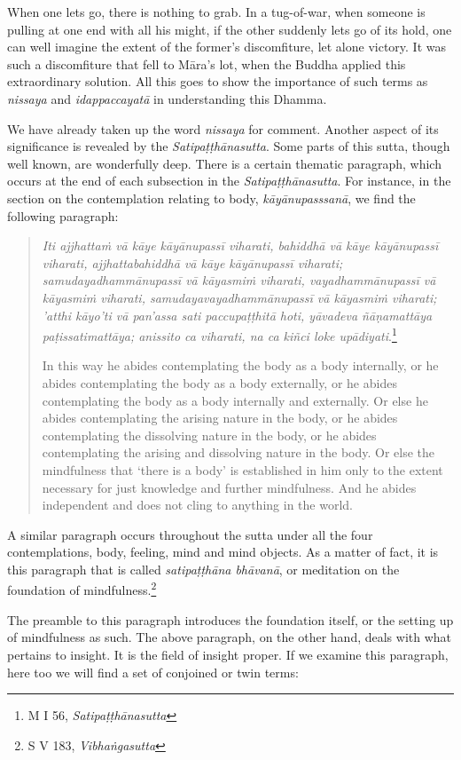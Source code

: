 When one lets go, there is nothing to grab. In a tug-of-war, when someone is pulling at one end with all his might, if the other suddenly lets go of its hold, one can well imagine the extent of the former's discomfiture, let alone victory. It was such a discomfiture that fell to Māra's lot, when the Buddha applied this extraordinary solution. All this goes to show the importance of such terms as \emph{nissaya} and \emph{idappaccayatā} in understanding this Dhamma.

We have already taken up the word \emph{nissaya} for comment. Another aspect of its significance is revealed by the \emph{Satipaṭṭhānasutta}. Some parts of this sutta, though well known, are wonderfully deep. There is a certain thematic paragraph, which occurs at the end of each subsection in the \emph{Satipaṭṭhānasutta}. For instance, in the section on the contemplation relating to body, \emph{kāyānupasssanā}, we find the following paragraph:

\begin{quote}
\emph{Iti ajjhattaṁ vā kāye kāyānupassī viharati, bahiddhā vā kāye kāyānupassī viharati, ajjhattabahiddhā vā kāye kāyānupassī viharati; samudayadhammānupassī vā kāyasmiṁ viharati, vayadhammānupassī vā kāyasmiṁ viharati, samudayavayadhammānupassī vā kāyasmiṁ viharati; 'atthi kāyo'ti vā pan'assa sati paccupaṭṭhitā hoti, yāvadeva ñāṇamattāya paṭissatimattāya; anissito ca viharati, na ca kiñci loke upādiyati}.\footnote{M I 56, \emph{Satipaṭṭhānasutta}}

In this way he abides contemplating the body as a body internally, or he abides contemplating the body as a body externally, or he abides contemplating the body as a body internally and externally. Or else he abides contemplating the arising nature in the body, or he abides contemplating the dissolving nature in the body, or he abides contemplating the arising and dissolving nature in the body. Or else the mindfulness that `there is a body' is established in him only to the extent necessary for just knowledge and further mindfulness. And he abides independent and does not cling to anything in the world.
\end{quote}

A similar paragraph occurs throughout the sutta under all the four contemplations, body, feeling, mind and mind objects. As a matter of fact, it is this paragraph that is called \emph{satipaṭṭhāna bhāvanā}, or meditation on the foundation of mindfulness.\footnote{S V 183, \emph{Vibhaṅgasutta}}

The preamble to this paragraph introduces the foundation itself, or the setting up of mindfulness as such. The above paragraph, on the other hand, deals with what pertains to insight. It is the field of insight proper. If we examine this paragraph, here too we will find a set of conjoined or twin terms:

